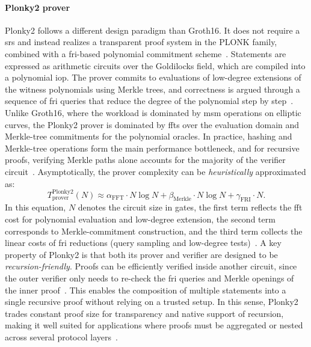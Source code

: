 \paragraph{Plonky2 prover}
Plonky2 follows a different design paradigm than Groth16. It does not require a \acrfull{srs} and instead realizes a transparent proof system in the PLONK family, combined with a \acrfull{fri}-based polynomial commitment scheme~\cite{cryptoeprint:2019/953,cryptoeprint:2018/046}. Statements are expressed as arithmetic circuits over the Goldilocks field, which are compiled into a polynomial \acrfull{iop}. The prover commits to evaluations of low-degree extensions of the witness polynomials using Merkle trees, and correctness is argued through a sequence of \acrshort{fri} queries that reduce the degree of the polynomial step by step~\cite{cryptoeprint:2019/1076}. Unlike Groth16, where the workload is dominated by \acrfull{msm} operations on elliptic curves, the Plonky2 prover is dominated by \acrshort{fft}s over the evaluation domain and Merkle-tree commitments for the polynomial oracles. In practice, hashing and Merkle-tree operations form the main performance bottleneck, and for recursive proofs, verifying Merkle paths alone accounts for the majority of the verifier circuit~\cite{Plonky2Draft2022}. Asymptotically, the prover complexity can be \emph{heuristically} approximated as:
\[
T_{\text{prover}}^{\text{Plonky2}}(N) 
\approx \alpha_{\text{FFT}} \cdot N\log N 
+ \beta_{\text{Merkle}} \cdot N\log N 
+ \gamma_{\text{FRI}} \cdot N.
\]
In this equation, $N$ denotes the circuit size in gates, the first term reflects the \acrshort{fft} cost for polynomial evaluation and low-degree extension, the second term corresponds to Merkle-commitment construction, and the third term collects the linear costs of \acrshort{fri} reductions (query sampling and low-degree tests)~\cite{cryptoeprint:2018/046}. A key property of Plonky2 is that both its prover and verifier are designed to be \emph{recursion-friendly}. Proofs can be efficiently verified inside another circuit, since the outer verifier only needs to re-check the \acrshort{fri} queries and Merkle openings of the inner proof~\cite{cryptoeprint:2019/1076}. This enables the composition of multiple statements into a single recursive proof without relying on a trusted setup. In this sense, Plonky2 trades constant proof size for transparency and native support of recursion, making it well suited for applications where proofs must be aggregated or nested across several protocol layers~\cite{Plonky2Draft2022}.


